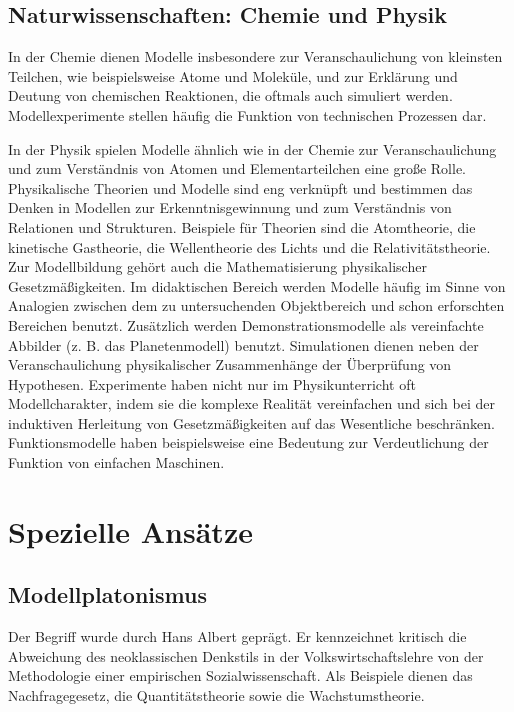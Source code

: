 \documentclass[a4paper, 12pt]{scrartcl}
\begin{document}
\subsection{Naturwissenschaften: Chemie und Physik}
In der Chemie dienen Modelle insbesondere zur Veranschaulichung von kleinsten Teilchen, wie beispielsweise Atome und Moleküle, und zur Erklärung und Deutung von chemischen Reaktionen, die oftmals auch simuliert werden. Modellexperimente stellen häufig die Funktion von technischen Prozessen dar.

In der Physik spielen Modelle ähnlich wie in der Chemie zur Veranschaulichung und zum Verständnis von Atomen und Elementarteilchen eine große Rolle. Physikalische Theorien und Modelle sind eng verknüpft und bestimmen das Denken in Modellen zur Erkenntnisgewinnung und zum Verständnis von Relationen und Strukturen. Beispiele für Theorien sind die Atomtheorie, die kinetische Gastheorie, die Wellentheorie des Lichts und die Relativitätstheorie. Zur Modellbildung gehört auch die Mathematisierung physikalischer Gesetzmäßigkeiten. Im didaktischen Bereich werden Modelle häufig im Sinne von Analogien zwischen dem zu untersuchenden Objektbereich und schon erforschten Bereichen benutzt. Zusätzlich werden Demonstrationsmodelle als vereinfachte Abbilder (z. B. das Planetenmodell) benutzt. Simulationen dienen neben der Veranschaulichung physikalischer Zusammenhänge der Überprüfung von Hypothesen. Experimente haben nicht nur im Physikunterricht oft Modellcharakter, indem sie die komplexe Realität vereinfachen und sich bei der induktiven Herleitung von Gesetzmäßigkeiten auf das Wesentliche beschränken. Funktionsmodelle haben beispielsweise eine Bedeutung zur Verdeutlichung der Funktion von einfachen Maschinen.

\section{Spezielle Ansätze}
\subsection{Modellplatonismus}
Der Begriff wurde durch Hans Albert geprägt. Er kennzeichnet kritisch die Abweichung des neoklassischen Denkstils in der Volkswirtschaftslehre von der Methodologie einer empirischen Sozialwissenschaft. Als Beispiele dienen das Nachfragegesetz, die Quantitätstheorie sowie die Wachstumstheorie.
\end{document}
